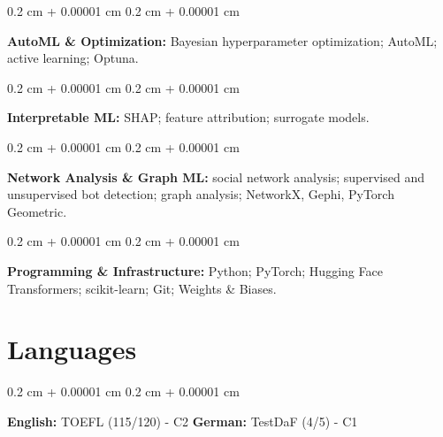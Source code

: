 \documentclass[10pt, letterpaper]{article}
\newenvironment{onecolentry}{
    \begin{adjustwidth}{
        0.2 cm + 0.00001 cm
    }{
        0.2 cm + 0.00001 cm
    }
}{
    \end{adjustwidth}
} %
\begin{document}
        \vspace{0.05 cm}

        \begin{onecolentry}
            \textbf{AutoML \& Optimization:} Bayesian hyperparameter optimization; AutoML; active learning; Optuna.
        \end{onecolentry}

        \vspace{0.05 cm}

        \begin{onecolentry}
            \textbf{Interpretable ML:} SHAP; feature attribution; surrogate models.
        \end{onecolentry}

        \vspace{0.05 cm}

        \begin{onecolentry}
            \textbf{Network Analysis \& Graph ML:} social network analysis; supervised and unsupervised bot detection; graph analysis; NetworkX, Gephi, PyTorch Geometric.
        \end{onecolentry}

        \vspace{0.05 cm}

        \begin{onecolentry}
            \textbf{Programming \& Infrastructure:} Python; PyTorch; Hugging Face Transformers; scikit-learn; Git; Weights \& Biases.
        \end{onecolentry}




    \section{Languages}
        \begin{onecolentry}
            \begin{tabbing}
                \textbf{English:} TOEFL (115/120) - C2 \hspace{2cm} \= \textbf{German:} TestDaF (4/5) - C1
            \end{tabbing}
        \end{onecolentry}
\end{document}
